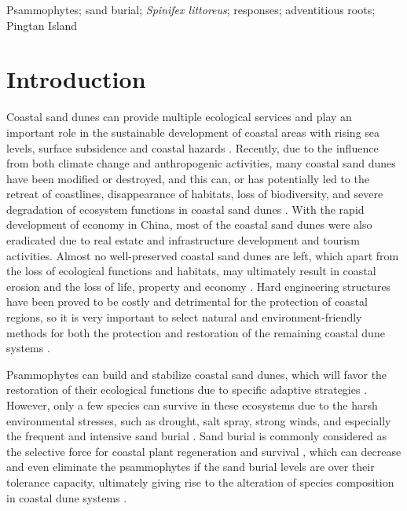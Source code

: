 \documentclass[]{interact}
\theoremstyle{plain}%
\theoremstyle{definition}
\theoremstyle{remark}
\begin{document}
\begin{keywords}
Psammophytes; sand burial; \textit{\textit{Spinifex littoreus}}; responses; adventitious roots; Pingtan Island
\end{keywords}


\section{Introduction}

\label{Introduction-1}
Coastal sand dunes can provide multiple ecological services and play an important role in the sustainable development of coastal areas with rising sea levels, surface subsidence and coastal hazards 
\citep{martinezFragilityConservationWorld2004,debattistiBelowgroundBiomassPlants2020}. 
Recently, due to the influence from both climate change and anthropogenic activities, many coastal sand dunes have been modified or destroyed, and this can, or has potentially led to the retreat of coastlines, disappearance of habitats, loss of biodiversity, and severe degradation of ecosystem functions in coastal sand dunes 
\citep{feaginCoastalErosionGlobal2005,schlacherVegetationGhostCrabs2011,quEffectsSandBurial2017}. 
With the rapid development of economy in China, most of the coastal sand dunes were also eradicated due to real estate and infrastructure development and tourism activities. Almost no well-preserved coastal sand dunes are left, which apart from the loss of ecological functions and habitats, may ultimately result in coastal erosion and the loss of life, property and economy 
\citep{yangDiurnalvariationcharacteristics2017}. 
Hard engineering structures have been proved to be costly and detrimental for the protection of coastal regions, so it is very important to select natural and environment-friendly methods for both the protection and restoration of the remaining coastal dune systems 
\citep{hanleyShiftingSandsCoastal2014}.

\label{Introduction-2}
Psammophytes can build and stabilize coastal sand dunes, which will favor the restoration of their ecological functions due to specific adaptive strategies 
\citep{yuanEffectsSandAccretion1993,brownMechanismsSurvivingBurial2018,debattistiBelowgroundBiomassPlants2020}. 
However, only a few species can survive in these ecosystems due to the harsh environmental stresses, such as drought, salt spray, strong winds, and especially the frequent and intensive sand burial 
\citep{maunEffectsBurialSand1986,hespEcologicalProcessesPlant1991,maunAdaptationsEnhancingSurvival1994,zhaoAdvanceDistributionAdaptability2014,duSaltSprayDistribution2020a}. 
Sand burial is commonly considered as the selective force for coastal plant regeneration and survival \citep{moreno-casasolaSandMovementFactor1986, maunAdaptationsEnhancingSurvival1994}, which can decrease and even eliminate the psammophytes if the sand burial levels are over their tolerance capacity, ultimately giving rise to the alteration of species composition in coastal dune systems \citep{maunZonationVegetationLacustrine1999,millerEffectsDisturbanceVegetation2015}. 
\end{document}
